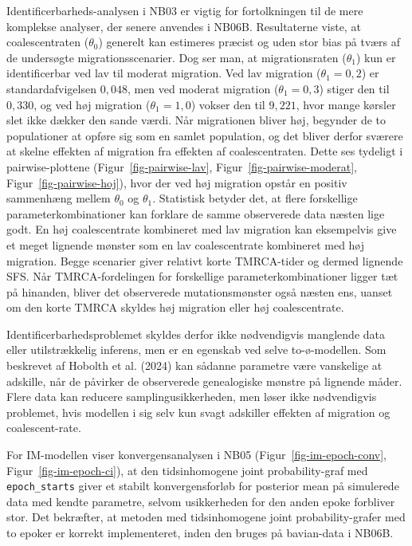 \documentclass[
  10pt,
  a4paper,
]{scrbook}
\begin{document}
Identificerbarheds-analysen i NB03 er vigtig for fortolkningen til de
mere komplekse analyser, der senere anvendes i NB06B. Resultaterne
viste, at coalescentraten (\(\theta_0\)) generelt kan estimeres præcist
og uden stor bias på tværs af de undersøgte migrationsscenarier. Dog ser
man, at migrationsraten (\(\theta_1\)) kun er identificerbar ved lav til
moderat migration. Ved lav migration (\(\theta_1 = 0{,}2\)) er
standardafvigelsen \(0{,}048\), men ved moderat migration
(\(\theta_1 = 0{,}3\)) stiger den til \(0{,}330\), og ved høj migration
(\(\theta_1=1{,}0\)) vokser den til \(9{,}221\), hvor mange kørsler slet
ikke dækker den sande værdi. Når migrationen bliver høj, begynder de to
populationer at opføre sig som en samlet population, og det bliver
derfor sværere at skelne effekten af migration fra effekten af
coalescentraten. Dette ses tydeligt i pairwise-plottene
(Figur~\ref{fig-pairwise-lav}, Figur~\ref{fig-pairwise-moderat},
Figur~\ref{fig-pairwise-hoj}), hvor der ved høj migration opstår en
positiv sammenhæng mellem \(\theta_0\) og \(\theta_1\). Statistisk
betyder det, at flere forskellige parameterkombinationer kan forklare de
samme observerede data næsten lige godt. En høj coalescentrate
kombineret med lav migration kan eksempelvis give et meget lignende
mønster som en lav coalescentrate kombineret med høj migration. Begge
scenarier giver relativt korte TMRCA-tider og dermed lignende SFS. Når
TMRCA-fordelingen for forskellige parameterkombinationer ligger tæt på
hinanden, bliver det observerede mutationsmønster også næsten ens,
uanset om den korte TMRCA skyldes høj migration eller høj
coalescentrate.

Identificerbarhedsproblemet skyldes derfor ikke nødvendigvis manglende
data eller utilstrækkelig inferens, men er en egenskab ved selve
to-ø-modellen. Som beskrevet af Hobolth et al. (2024) kan sådanne
parametre være vanskelige at adskille, når de påvirker de observerede
genealogiske mønstre på lignende måder. Flere data kan reducere
samplingusikkerheden, men løser ikke nødvendigvis problemet, hvis
modellen i sig selv kun svagt adskiller effekten af migration og
coalescent-rate.

For IM-modellen viser konvergensanalysen i NB05
(Figur~\ref{fig-im-epoch-conv}, Figur~\ref{fig-im-epoch-ci}), at den
tidsinhomogene joint probability-graf med \texttt{epoch\_starts} giver
et stabilt konvergensforløb for posterior mean på simulerede data med
kendte parametre, selvom usikkerheden for den anden epoke forbliver
stor. Det bekræfter, at metoden med tidsinhomogene joint
probability-grafer med to epoker er korrekt implementeret, inden den
bruges på bavian-data i NB06B.
\end{document}

